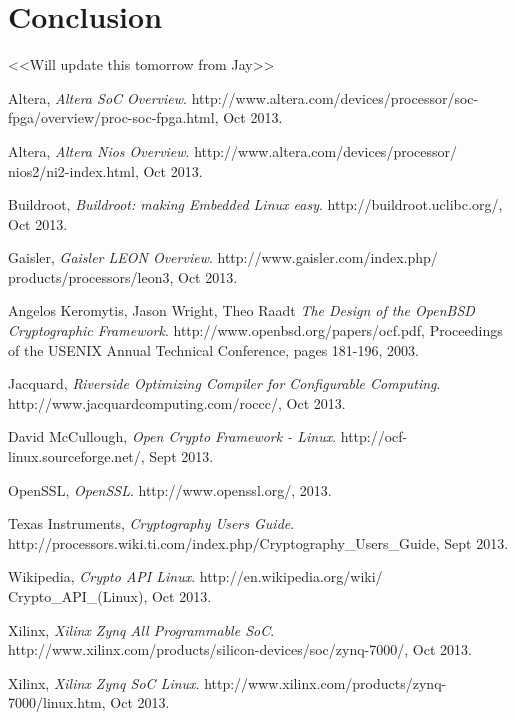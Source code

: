 \documentclass[journal]{IEEEtran}
\begin{document}
\section{Conclusion}

<<Will update this tomorrow from Jay>>


\begin{thebibliography}{1}

Altera,
 \emph{Altera SoC Overview}.    
 http://www.altera.com/devices/processor/soc-fpga/overview/proc-soc-fpga.html, Oct 2013.

Altera,
 \emph{Altera Nios Overview}.    
 http://www.altera.com/devices/processor/ nios2/ni2-index.html, Oct 2013.

Buildroot,
 \emph{Buildroot: making Embedded Linux easy}.    
 http://buildroot.uclibc.org/, Oct 2013.

Gaisler,
 \emph{Gaisler LEON Overview}.
 http://www.gaisler.com/index.php/ products/processors/leon3, Oct 2013.

Angelos Keromytis, Jason Wright, Theo Raadt
 \emph{The Design of the OpenBSD Cryptographic Framework}.    
 http://www.openbsd.org/papers/ocf.pdf, Proceedings of the USENIX Annual Technical Conference, pages 181-196, 2003.

Jacquard,
 \emph{Riverside Optimizing Compiler for Configurable Computing}.    
 http://www.jacquardcomputing.com/roccc/, Oct 2013. 
  
David McCullough,
 \emph{Open Crypto Framework - Linux}.    
 http://ocf-linux.sourceforge.net/, Sept 2013.

OpenSSL,
 \emph{OpenSSL}.    
 http://www.openssl.org/, 2013.

Texas Instruments,
 \emph{Cryptography Users Guide}.    
 http://processors.wiki.ti.com/index.php/Cryptography\_Users\_Guide, Sept 2013.
 
Wikipedia,
 \emph{Crypto API Linux}.    
 http://en.wikipedia.org/wiki/ Crypto\_API\_(Linux), Oct 2013.

Xilinx,
 \emph{Xilinx Zynq All Programmable SoC}.    
 http://www.xilinx.com/products/silicon-devices/soc/zynq-7000/, Oct 2013.
 
Xilinx,
 \emph{Xilinx Zynq SoC Linux}.    
 http://www.xilinx.com/products/zynq-7000/linux.htm, Oct 2013.
 

\end{thebibliography}
\end{document}
